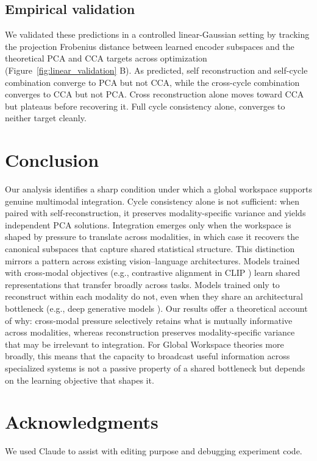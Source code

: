 \documentclass{ccn}  %
\begin{document}
\subsection{Empirical validation}
We validated these predictions in a controlled linear-Gaussian setting by tracking the
projection Frobenius distance between learned encoder subspaces and the theoretical PCA and CCA targets across optimization (Figure~\ref{fig:linear_validation} B). As predicted, self reconstruction and self-cycle combination converge to PCA but not CCA, while the cross-cycle combination converges to CCA but not PCA. Cross reconstruction alone moves toward CCA but plateaus before recovering it. Full cycle consistency alone, converges to neither target cleanly.
\section{Conclusion}
Our analysis identifies a sharp condition under which a global workspace supports genuine multimodal integration. Cycle consistency alone is not sufficient: when paired with self-reconstruction, it preserves modality-specific variance and yields independent PCA solutions. Integration emerges only when the workspace is shaped by pressure to translate across modalities, in which case it recovers the canonical subspaces that capture shared statistical structure.
This distinction mirrors a pattern across existing vision--language architectures. Models trained with cross-modal objectives (e.g., contrastive alignment in CLIP \citep{radford2021learning}) learn shared representations that transfer broadly across tasks. Models trained only to reconstruct within each modality do not, even when they share an architectural bottleneck (e.g., deep generative models \citep{suzuki2016joint}). Our results offer a theoretical account of why: cross-modal pressure selectively retains what is mutually informative across modalities, whereas reconstruction preserves modality-specific variance that may be irrelevant to integration. For Global Workspace theories more broadly, this means that the capacity to broadcast useful information across specialized systems is not a passive property of a shared bottleneck but depends on the learning objective that shapes it.
\section*{Acknowledgments}
We used Claude to assist with editing purpose and debugging experiment code.
\printbibliography
\end{document}
